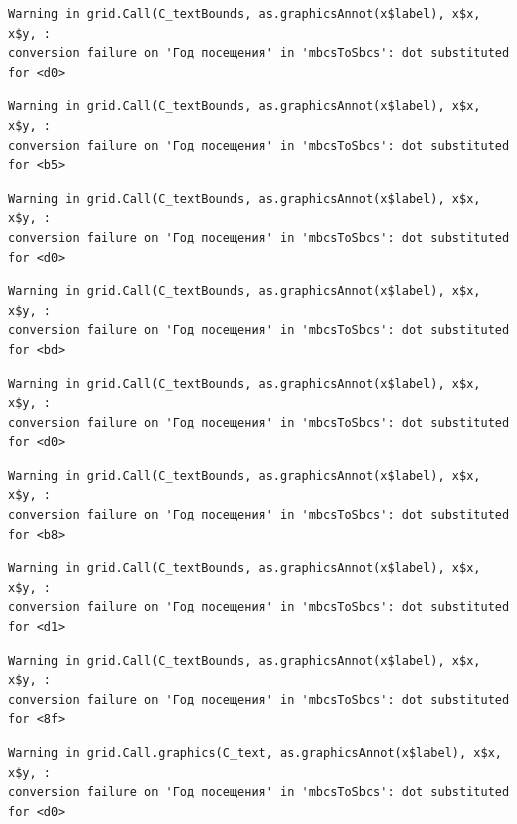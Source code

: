 \documentclass[
  letterpaper,
  DIV=11,
  numbers=noendperiod]{scrartcl}
\begin{document}
\begin{verbatim}
Warning in grid.Call(C_textBounds, as.graphicsAnnot(x$label), x$x, x$y, :
conversion failure on 'Год посещения' in 'mbcsToSbcs': dot substituted for <d0>
\end{verbatim}

\begin{verbatim}
Warning in grid.Call(C_textBounds, as.graphicsAnnot(x$label), x$x, x$y, :
conversion failure on 'Год посещения' in 'mbcsToSbcs': dot substituted for <b5>
\end{verbatim}

\begin{verbatim}
Warning in grid.Call(C_textBounds, as.graphicsAnnot(x$label), x$x, x$y, :
conversion failure on 'Год посещения' in 'mbcsToSbcs': dot substituted for <d0>
\end{verbatim}

\begin{verbatim}
Warning in grid.Call(C_textBounds, as.graphicsAnnot(x$label), x$x, x$y, :
conversion failure on 'Год посещения' in 'mbcsToSbcs': dot substituted for <bd>
\end{verbatim}

\begin{verbatim}
Warning in grid.Call(C_textBounds, as.graphicsAnnot(x$label), x$x, x$y, :
conversion failure on 'Год посещения' in 'mbcsToSbcs': dot substituted for <d0>
\end{verbatim}

\begin{verbatim}
Warning in grid.Call(C_textBounds, as.graphicsAnnot(x$label), x$x, x$y, :
conversion failure on 'Год посещения' in 'mbcsToSbcs': dot substituted for <b8>
\end{verbatim}

\begin{verbatim}
Warning in grid.Call(C_textBounds, as.graphicsAnnot(x$label), x$x, x$y, :
conversion failure on 'Год посещения' in 'mbcsToSbcs': dot substituted for <d1>
\end{verbatim}

\begin{verbatim}
Warning in grid.Call(C_textBounds, as.graphicsAnnot(x$label), x$x, x$y, :
conversion failure on 'Год посещения' in 'mbcsToSbcs': dot substituted for <8f>
\end{verbatim}

\begin{verbatim}
Warning in grid.Call.graphics(C_text, as.graphicsAnnot(x$label), x$x, x$y, :
conversion failure on 'Год посещения' in 'mbcsToSbcs': dot substituted for <d0>
\end{verbatim}
\end{document}
